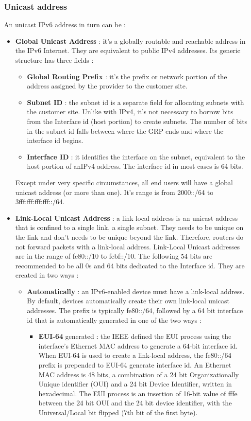 \documentclass[11pt]{article}
\begin{document}
\subsubsection{Unicast address}
An unicast IPv6 address in turn can be :
\begin{itemize}
\item \textbf{Global Unicast Address} : it's a globally routable and reachable address in the IPv6 Internet. They are equivalent to public IPv4 addresses. Its generic structure has three fields :
\begin{itemize}
\item \textbf{Global Routing Prefix} : it's the prefix or network portion of the address assigned by the provider to the customer site.
\item \textbf{Subnet ID} : the subnet id is a separate field for allocating subnets with the customer site. Unlike with IPv4, it's not necessary to borrow bits from the Interface id (host portion) to create subnets. The number of bits in the subnet id falls between where the GRP ends and where the interface id begins.
\item \textbf{Interface ID} : it identifies the interface on the subnet, equivalent to the host portion of anIPv4 address. The interface id in most cases is 64 bits.
\end{itemize}
 Except under very specific circumstances, all end users will have a global unicast address (or more than one). It's range is from 2000::/64 to 3fff:fff:fff:fff::/64.
\item \textbf{Link-Local Unicast Address} : a link-local address is an unicast address that is confined to a single link, a single subnet. They needs to be unique on the link and don't needs to be unique beyond the link. Therefore, routers do not forward packets with a link-local address. Link-Local Unicast  addresses are in the range of fe80::/10 to febf::/10. The following 54 bits are recommended to be all 0s and 64 bits dedicated to the Interface id. They are created in two ways :
\begin{itemize}
\item \textbf{Automatically} : an IPv6-enabled device must have a link-local address. By default, devices automatically create their own link-local unicast addresses. The prefix is typically fe80::/64, followed by a 64 bit interface id that is automatically generated in one of the two ways :
\begin{itemize}
\item \textbf{EUI-64} generated : the IEEE defined the EUI process using the interface's Ethernet MAC address to generate a 64-bit interface id. When EUI-64 is used to create a link-local address, the fe80::/64 prefix is prepended to EUI-64 generate interface id. An Ethernet MAC address is 48  bits, a combination of a 24 bit Organizationally Unique identifier (OUI) and a 24 bit Device Identifier, written in hexadecimal. The EUI process is an insertion of 16-bit value of fffe between the 24 bit OUI and the 24 bit device identifier, with the Universal/Local bit flipped (7th bit of the first byte).       

\end{itemize}
\end{itemize}
\end{itemize}
\end{document}
